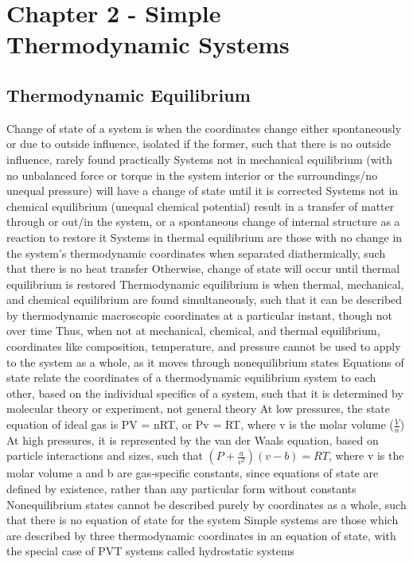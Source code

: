 \documentclass[11 pt, twoside]{article}
\newenvironment{outline*}
{
	\begin{outline}[enumerate]
	}
	{\end{outline}
}
\begin{document}
\section{Chapter 2 - Simple Thermodynamic Systems}
\subsection{Thermodynamic Equilibrium}
\begin{outline*}
\1 Change of state of a system is when the coordinates change either spontaneously or due to outside influence, isolated if the former, such that there is no outside influence, rarely found practically
\2 Systems not in mechanical equilibrium (with no unbalanced force or torque in the system interior or the surroundings/no unequal pressure) will have a change of state until it is corrected
\2 Systems not in chemical equilibrium (unequal chemical potential) result in a transfer of matter through or out/in the system, or a spontaneous change of internal structure as a reaction to restore it
\2 Systems in thermal equilibrium are those with no change in the system's thermodynamic coordinates when separated diathermically, such that there is no heat transfer
\3 Otherwise, change of state will occur until thermal equilibrium is restored
\1 Thermodynamic equilibrium is when thermal, mechanical, and chemical equilibrium are found simultaneously, such that it can be described by thermodynamic macroscopic coordinates at a particular instant, though not over time
\2 Thus, when not at mechanical, chemical, and thermal equilibrium, coordinates like composition, temperature, and pressure cannot be used to apply to the system as a whole, as it moves through nonequilibrium states
\1 Equations of state relate the coordinates of a thermodynamic equilibrium system to each other, based on the individual specifics of a system, such that it is determined by molecular theory or experiment, not general theory
\2 At low pressures, the state equation of ideal gas is PV = nRT, or Pv = RT, where v is the molar volume ($\frac{V}{n}$)
\2 At high pressures, it is represented by the van der Waals equation, based on particle interactions and sizes, such that $(P + \frac{a}{v^2})(v - b) = RT$, where v is the molar volume
\3 a and b are gas-specific constants, since equations of state are defined by existence, rather than any particular form without constants
\2 Nonequilibrium states cannot be described purely by coordinates as a whole, such that there is no equation of state for the system
\1 Simple systems are those which are described by three thermodynamic coordinates in an equation of state, with the special case of PVT systems called hydrostatic systems

\end{outline*}
\end{document}

